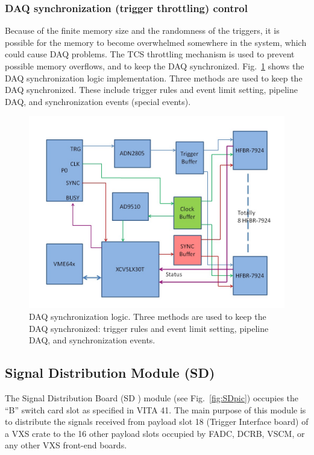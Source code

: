\subsubsection{DAQ synchronization (trigger throttling) control}

Because of the finite memory size and the randomness of the triggers, it is possible for the memory to become overwhelmed somewhere in the system, which could cause DAQ problems.   The TCS throttling mechanism is used to prevent possible memory overflows, and to keep the DAQ synchronized.  Fig.~\ref{fig:DAQ_synchronization} shows the DAQ synchronization logic implementation.  Three methods are used to keep the DAQ synchronized.  These include trigger rules and event limit setting, pipeline DAQ, and synchronization events (special events).

\begin{figure}[hbt]
	\centering
	\includegraphics[width=1.0\columnwidth,keepaspectratio]{img/TDdiagram.jpg}
	\caption{DAQ synchronization logic. Three methods are used to keep the DAQ synchronized: trigger rules and event limit setting, pipeline DAQ, and synchronization events.}
	\label{fig:DAQ_synchronization}
\end{figure}

	
\subsection{Signal Distribution Module (SD)}

The Signal Distribution Board (SD \cite{sd-ref}) module (see Fig.~\ref{fig:SDpic}) occupies the “B” switch card slot as specified in VITA 41. The main purpose of this module is to distribute the signals received from payload slot 18 (Trigger Interface board) of a VXS crate to the 16 other payload slots occupied by FADC, DCRB, VSCM, or any other VXS front-end boards.

